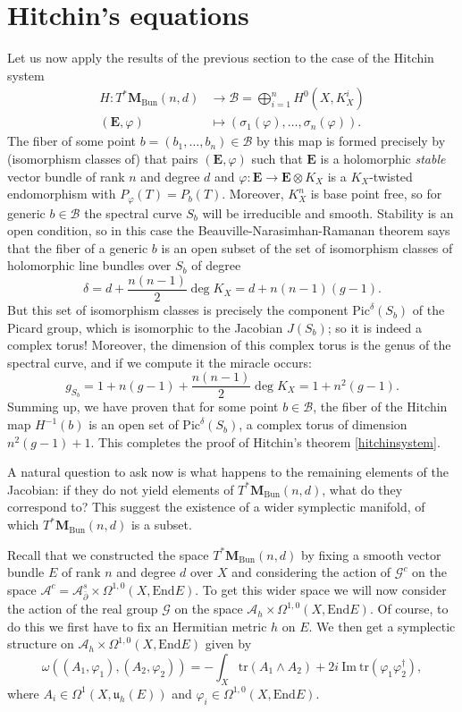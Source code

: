 \documentclass[12pt,a4paper]{book}
\theoremstyle{definition} \newtheorem{defn}[thm]{Definition}
\theoremstyle{definition} \newtheorem{ejemplo}[thm]{Example}
\theoremstyle{remark} \newtheorem{rem}[thm]{Remark}
\def\AA{\mathscr{A}}
\def\BB{\mathscr{B}}
\def\GG{\mathscr{G}}
\def\tr{\mathrm{tr}}
\def\End{\mathrm{End}}
\def\Bun{\mathbf{M}_{\mathrm{Bun}}}
\def\Pic{\mathrm{Pic}}
\def\delbar{\bar{\partial}}
\newcommand{\ve}[1]{\mathbf{#1}}
\begin{document}
	\section{Hitchin's equations}
	Let us now apply the results of the previous section to the case of the Hitchin system
	\begin{align*}
	  H:T^*\Bun(n,d)& \longrightarrow \BB = \bigoplus_{i=1}^n H^0(X,K_X^i) \\
	  (\ve{E},\varphi) &\longmapsto (\sigma_1(\varphi),\dots,\sigma_n(\varphi)). 
	  \end{align*}
	  The fiber of some point $b=(b_1,\dots,b_n)\in \BB$ by this map is formed precisely by (isomorphism classes of) that pairs $(\ve{E},\varphi)$ such that $\ve{E}$ is a holomorphic \textit{stable} vector bundle of rank $n$ and degree $d$ and $\varphi:\ve{E}\rightarrow \ve{E}\otimes K_X$ is a $K_X$-twisted endomorphism with $P_\varphi(T)=P_b(T)$. Moreover, $K_X^n$ is base point free, so for generic $b\in \BB$ the spectral curve $S_b$ will be irreducible and smooth. Stability is an open condition, so in this case the Beauville-Narasimhan-Ramanan theorem says that the fiber of a generic $b$ is an open subset of the set of isomorphism classes of holomorphic line bundles over $S_b$ of degree 
	  $$\delta=d+\frac{n(n-1)}{2}\deg K_X=d+n(n-1)(g-1).$$
	  But this set of isomorphism classes is precisely the component $\Pic^\delta (S_b)$ of the Picard group, which is isomorphic to the Jacobian $J(S_b)$; so it is indeed a complex torus! Moreover, the dimension of this complex torus is the genus of the spectral curve, and if we compute it the miracle occurs:
	  \begin{equation*}
	    g_{S_b}=1+n(g-1)+\frac{n(n-1)}{2}\deg K_X=1+n^2(g-1).
	  \end{equation*}
	  Summing up, we have proven that for some point $b\in \BB$, the fiber of the Hitchin map $H^{-1}(b)$ is an open set of $\Pic^{\delta}(S_b)$, a complex torus of dimension $n^2(g-1)+1$. This completes the proof of Hitchin's theorem \ref{hitchinsystem}.

	  A natural question to ask now is what happens to the remaining elements of the Jacobian: if they do not yield elements of $T^*\Bun(n,d)$, what do they correspond to? This suggest the existence of a wider symplectic manifold, of which $T^*\Bun(n,d)$ is a subset. 

	  Recall that we constructed the space $T^*\Bun(n,d)$ by fixing a smooth vector bundle $E$ of rank $n$ and degree $d$ over $X$ and considering the action of $\GG^c$ on the space $\AA^c=\AA_{\delbar}^s \times \Omega^{1,0}(X,\End E)$. To get this wider space we will now consider the action of the real group $\GG$ on the space $\AA_h \times \Omega^{1,0}(X,\End E)$. Of course, to do this we first have to fix an Hermitian metric $h$ on $E$. We then get a symplectic structure on $\AA_h \times \Omega^{1,0}(X,\End E)$ given by
	  \begin{equation*}
	    \omega\left( (A_1,\varphi_1),(A_2,\varphi_2) \right)=-\int_X \tr(A_1\wedge A_2) +2i\ \mathrm{Im}\ \tr(\varphi_1 \varphi_2^\dagger),
	  \end{equation*}
	  where $A_i \in \Omega^{1}(X,\mathfrak{u}_h(E))$ and $\varphi_i \in \Omega^{1,0}(X,\End E)$.
\end{document}
